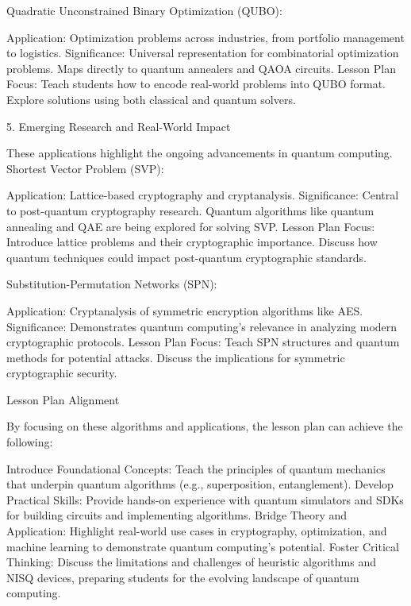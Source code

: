 Quadratic Unconstrained Binary Optimization (QUBO):

    Application: Optimization problems across industries, from portfolio management to logistics.
    Significance:
        Universal representation for combinatorial optimization problems.
        Maps directly to quantum annealers and QAOA circuits.
    Lesson Plan Focus:
        Teach students how to encode real-world problems into QUBO format.
        Explore solutions using both classical and quantum solvers.

5. Emerging Research and Real-World Impact

These applications highlight the ongoing advancements in quantum computing.
Shortest Vector Problem (SVP):

    Application: Lattice-based cryptography and cryptanalysis.
    Significance:
        Central to post-quantum cryptography research.
        Quantum algorithms like quantum annealing and QAE are being explored for solving SVP.
    Lesson Plan Focus:
        Introduce lattice problems and their cryptographic importance.
        Discuss how quantum techniques could impact post-quantum cryptographic standards.

Substitution-Permutation Networks (SPN):

    Application: Cryptanalysis of symmetric encryption algorithms like AES.
    Significance:
        Demonstrates quantum computing’s relevance in analyzing modern cryptographic protocols.
    Lesson Plan Focus:
        Teach SPN structures and quantum methods for potential attacks.
        Discuss the implications for symmetric cryptographic security.

Lesson Plan Alignment

By focusing on these algorithms and applications, the lesson plan can achieve the following:

    Introduce Foundational Concepts: Teach the principles of quantum mechanics that underpin quantum algorithms (e.g., superposition, entanglement).
    Develop Practical Skills: Provide hands-on experience with quantum simulators and SDKs for building circuits and implementing algorithms.
    Bridge Theory and Application: Highlight real-world use cases in cryptography, optimization, and machine learning to demonstrate quantum computing’s potential.
    Foster Critical Thinking: Discuss the limitations and challenges of heuristic algorithms and NISQ devices, preparing students for the evolving landscape of quantum computing.
